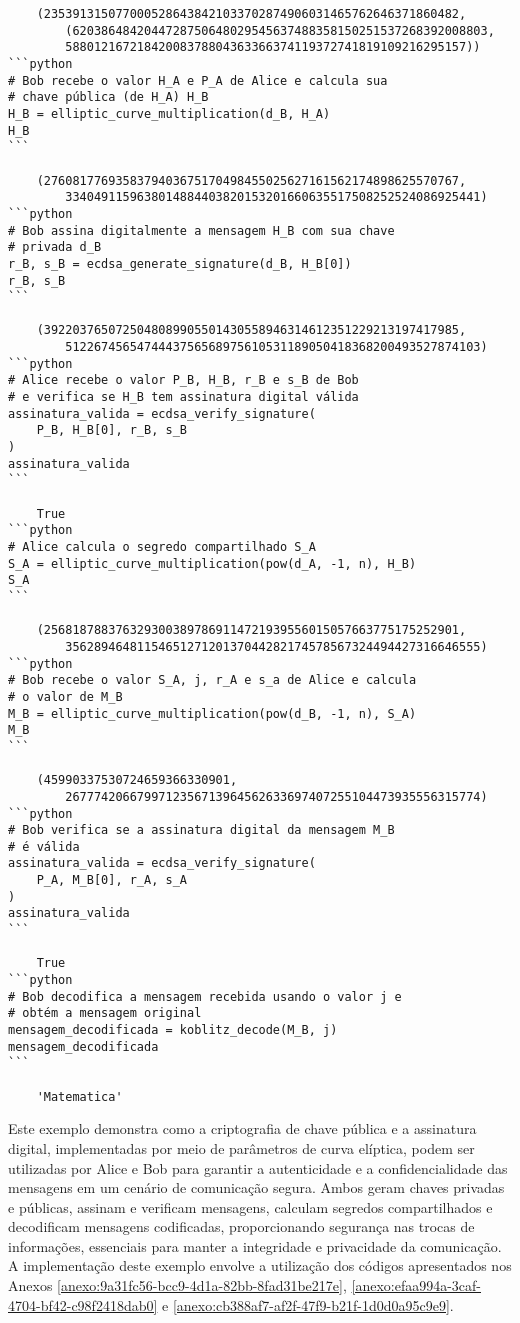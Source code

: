 \begin{verbatim}
	(2353913150770005286438421033702874906031465762646371860482,
		(6203864842044728750648029545637488358150251537268392008803,
		58801216721842008378804363366374119372741819109216295157))
```python
# Bob recebe o valor H_A e P_A de Alice e calcula sua
# chave pública (de H_A) H_B
H_B = elliptic_curve_multiplication(d_B, H_A)
H_B
```

	(2760817769358379403675170498455025627161562174898625570767,
		3340491159638014884403820153201660635517508252524086925441)
```python
# Bob assina digitalmente a mensagem H_B com sua chave
# privada d_B
r_B, s_B = ecdsa_generate_signature(d_B, H_B[0])
r_B, s_B
```

	(3922037650725048089905501430558946314612351229213197417985,
		5122674565474443756568975610531189050418368200493527874103)
```python
# Alice recebe o valor P_B, H_B, r_B e s_B de Bob
# e verifica se H_B tem assinatura digital válida
assinatura_valida = ecdsa_verify_signature(
	P_B, H_B[0], r_B, s_B
)
assinatura_valida
```

	True
```python
# Alice calcula o segredo compartilhado S_A
S_A = elliptic_curve_multiplication(pow(d_A, -1, n), H_B)
S_A
```

	(2568187883763293003897869114721939556015057663775175252901,
		3562894648115465127120137044282174578567324494427316646555)
```python
# Bob recebe o valor S_A, j, r_A e s_a de Alice e calcula
# o valor de M_B
M_B = elliptic_curve_multiplication(pow(d_B, -1, n), S_A)
M_B
```

	(45990337530724659366330901,
		2677742066799712356713964562633697407255104473935556315774)
```python
# Bob verifica se a assinatura digital da mensagem M_B
# é válida
assinatura_valida = ecdsa_verify_signature(
	P_A, M_B[0], r_A, s_A
)
assinatura_valida
```

	True
```python
# Bob decodifica a mensagem recebida usando o valor j e
# obtém a mensagem original
mensagem_decodificada = koblitz_decode(M_B, j)
mensagem_decodificada
```

	'Matematica'	
\end{verbatim}

Este exemplo demonstra como a criptografia de chave pública e a assinatura
digital, implementadas por meio de parâmetros de curva elíptica, podem ser
utilizadas por Alice e Bob para garantir a autenticidade e a confidencialidade
das mensagens em um cenário de comunicação segura. Ambos geram chaves privadas
e públicas, assinam e verificam mensagens, calculam segredos compartilhados e
decodificam mensagens codificadas, proporcionando segurança nas trocas de
informações, essenciais para manter a integridade e privacidade da comunicação.
A implementação deste exemplo envolve a utilização dos códigos apresentados nos
Anexos \ref{anexo:9a31fc56-bcc9-4d1a-82bb-8fad31be217e},
\ref{anexo:efaa994a-3caf-4704-bf42-c98f2418dab0} e
\ref{anexo:cb388af7-af2f-47f9-b21f-1d0d0a95c9e9}.